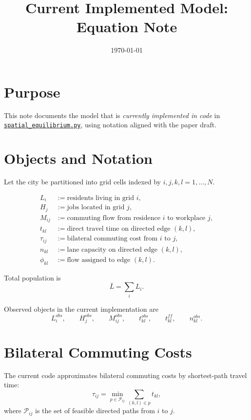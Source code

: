 \documentclass[11pt]{article}
\title{Current Implemented Model: Equation Note}
\author{}
\date{\today}
\begin{document}
\maketitle

\section*{Purpose}

This note documents the model that is \emph{currently implemented in code} in
\href{/Users/fxr/Dropbox/Projects/TidalLanes/data_work/src/model/spatial_equilibrium.py}{\texttt{spatial\_equilibrium.py}},
using notation aligned with the paper draft.

\section{Objects and Notation}

Let the city be partitioned into grid cells indexed by $i,j,k,l = 1,\dots,N$.

\begin{align*}
L_i &:= \text{residents living in grid } i, \\
H_j &:= \text{jobs located in grid } j, \\
M_{ij} &:= \text{commuting flow from residence } i \text{ to workplace } j, \\
t_{kl} &:= \text{direct travel time on directed edge } (k,l), \\
\tau_{ij} &:= \text{bilateral commuting cost from } i \text{ to } j, \\
n_{kl} &:= \text{lane capacity on directed edge } (k,l), \\
\phi_{kl} &:= \text{flow assigned to edge } (k,l).
\end{align*}

Total population is
\[
\bar L = \sum_i L_i.
\]

Observed objects in the current implementation are
\[
L_i^{obs}, \qquad H_j^{obs}, \qquad M_{ij}^{obs}, \qquad t_{kl}^{obs}, \qquad t_{kl}^{ff}, \qquad n_{kl}^{obs}.
\]

\section{Bilateral Commuting Costs}

The current code approximates bilateral commuting costs by shortest-path travel time:
\[
\tau_{ij} = \min_{p \in \mathcal P_{ij}} \sum_{(k,l)\in p} t_{kl},
\]
where $\mathcal P_{ij}$ is the set of feasible directed paths from $i$ to $j$.
\end{document}
